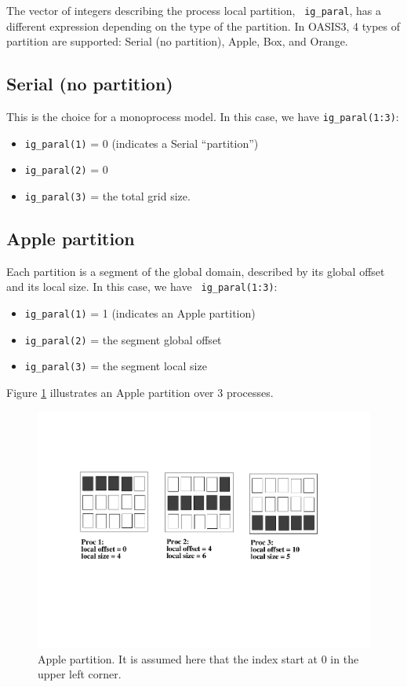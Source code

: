 The vector of integers describing the process local partition, {\tt
ig\_paral}, has a different expression depending on the type of the
partition. In OASIS3, 4 types of partition are supported: Serial (no
partition), Apple, Box, and Orange.
 
\subsection{Serial (no partition)}

This is the choice for a monoprocess model. In this case, we have 
{\tt ig\_paral(1:3)}:
\begin{itemize}
 \item {\tt ig\_paral(1)} = 0 (indicates a Serial ``partition'')
 \item {\tt ig\_paral(2)} = 0
 \item {\tt ig\_paral(3)} = the total grid size.
\end{itemize}

\subsection{Apple partition} 

Each partition is a segment of the global domain, described by its
global offset and its local size. In this case, we have {\tt
ig\_paral(1:3)}:
\begin{itemize}
 \item {\tt ig\_paral(1)} = 1 (indicates an Apple partition)
 \item {\tt ig\_paral(2)} = the segment global offset
 \item {\tt ig\_paral(3)} = the segment local size
\end{itemize}

Figure \ref{apple_partition} illustrates an Apple partition over 3
processes. 
\begin{figure}
\includegraphics[scale=.6]{figures/apple_new} 
\caption{Apple partition. It is assumed here that the index start at 0 in the upper left corner.}
\label{apple_partition}
\end{figure}


